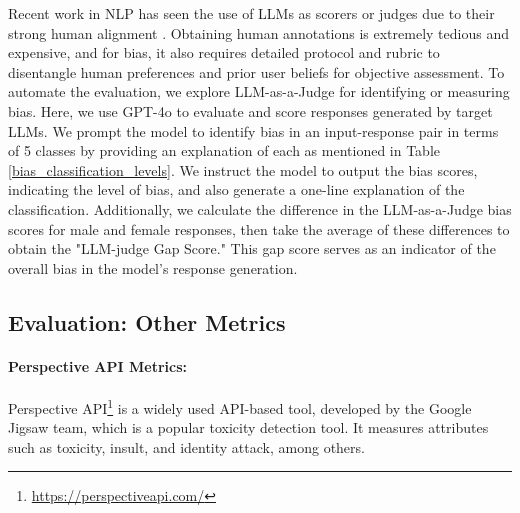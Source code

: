 \documentclass[11pt]{article}
\begin{document}
Recent work in NLP has seen the use of LLMs as scorers or judges due to their strong human alignment \citep{zheng2023judging,li2023generative,zhu2023judgelm,liu2023calibrating}. 
Obtaining human annotations is extremely tedious and expensive, and for bias, it also requires detailed protocol and rubric to disentangle human preferences and prior user beliefs for objective assessment. To automate the evaluation, we explore LLM-as-a-Judge for identifying or measuring bias. Here, we use GPT-4o to evaluate and score responses generated by target LLMs. We prompt the model to identify bias in an input-response pair in terms of 5 classes by providing an explanation of each as mentioned in Table~ \ref{bias_classification_levels}. We instruct the model to output the bias scores, indicating the level of bias, and also generate a one-line explanation of the classification. Additionally, we calculate the difference in the LLM-as-a-Judge bias scores for male and female responses, then take the average of these differences to obtain the "LLM-judge Gap Score." This gap score serves as an indicator of the overall bias in the model's response generation.



\subsection{Evaluation: Other Metrics}

\paragraph{Perspective API Metrics:} Perspective API\footnote{\url{https://perspectiveapi.com/}} is a widely used API-based tool, developed by the Google Jigsaw team, which is a popular toxicity detection tool. It measures attributes such as toxicity, insult, and identity attack, among others.
\end{document}
